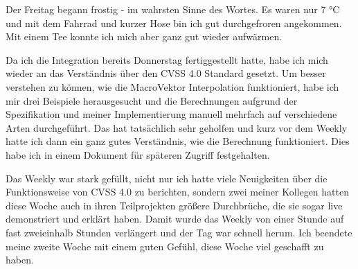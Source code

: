 Der Freitag begann frostig - im wahrsten Sinne des Wortes.
Es waren nur 7 °C und mit dem Fahrrad und kurzer Hose bin ich gut durchgefroren angekommen.
Mit einem Tee konnte ich mich aber ganz gut wieder aufwärmen.

Da ich die Integration bereits Donnerstag fertiggestellt hatte, habe ich mich wieder an das Verständnis über den CVSS 4.0 Standard gesetzt.
Um besser verstehen zu können, wie die MacroVektor Interpolation funktioniert, habe ich mir drei Beispiele herausgesucht und die Berechnungen aufgrund der Spezifikation und meiner Implementierung manuell mehrfach auf verschiedene Arten durchgeführt.
Das hat tatsächlich sehr geholfen und kurz vor dem Weekly hatte ich dann ein ganz gutes Verständnis, wie die Berechnung funktioniert.
Dies habe ich in einem Dokument für späteren Zugriff festgehalten.

Das Weekly war stark gefüllt, nicht nur ich hatte viele Neuigkeiten über die Funktionsweise von CVSS 4.0 zu berichten, sondern zwei meiner Kollegen hatten diese Woche auch in ihren Teilprojekten größere Durchbrüche, die sie sogar live demonstriert und erklärt haben.
Damit wurde das Weekly von einer Stunde auf fast zweieinhalb Stunden verlängert und der Tag war schnell herum.
Ich beendete meine zweite Woche mit einem guten Gefühl, diese Woche viel geschafft zu haben.
